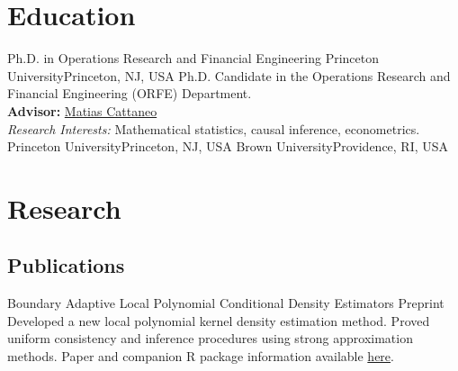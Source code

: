 \documentclass[10pt,a4paper,roman]{moderncv}        %
\begin{document}
\makecvtitle

\section{Education}
{Ph.D. in Operations Research and Financial Engineering}
{Princeton University}{Princeton, NJ, USA}{}
{Ph.D. Candidate in the Operations Research and Financial Engineering (ORFE) Department.\\
\textbf{Advisor: }\color{blue}\href{https://cattaneo.princeton.edu}{Matias Cattaneo}\color{black}\\
\textit{Research Interests:} Mathematical statistics, causal inference, econometrics.}
{Princeton University}{Princeton, NJ, USA}{}{}
{Brown University}{Providence, RI, USA}{}{}  %


\section{Research}
\subsection{Publications}
{Boundary Adaptive Local Polynomial Conditional Density Estimators}
{Preprint}{}
{Developed a new local polynomial kernel density estimation method.
  Proved uniform consistency and inference procedures using strong approximation
  methods.
  Paper and companion R package information available \color{blue}\href{https://rajitachandak.github.io/publications/}{here}.}
\end{document}
